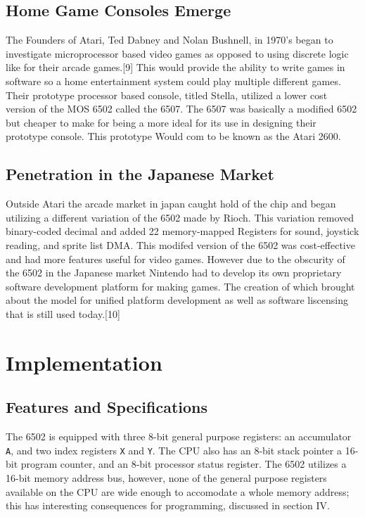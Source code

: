 \documentclass[journal]{IEEEtran}
\begin{document}
\subsection{Home Game Consoles Emerge}
The Founders of Atari, Ted Dabney and Nolan Bushnell, in 1970's began to investigate microprocessor based 
video games as opposed to using discrete logic like for their arcade games.[9]  This would provide the ability 
to write games in software so a home entertainment system could play multiple different games.  Their 
prototype processor based console, titled Stella, utilized a lower cost version of the MOS 6502 called the 
6507.  The 6507 was basically a modified 6502 but cheaper to make for being a more ideal for its use in designing 
their prototype console.  This prototype Would com to be known as the Atari 2600.  


\subsection{Penetration in the Japanese Market}
Outside Atari the arcade market in japan caught hold of the chip and began utilizing a different variation of 
the 6502 made by Rioch.  This variation removed binary-coded decimal and added 22 memory-mapped Registers for
sound, joystick reading, and sprite list DMA.  This modifed version of the 6502 was cost-effective and had more
features useful for video games.  However due to the obscurity of the 6502 in the Japanese market Nintendo had
to develop its own proprietary software development platform for making games.  The creation of which brought 
about the model for unified platform development as well as software liscensing that is still used today.[10]



\section{Implementation}

\subsection{Features and Specifications}

The 6502 is equipped with three 8-bit general purpose registers: an accumulator
\texttt{A}, and two index registers \texttt{X} and \texttt{Y}. The CPU also has
an 8-bit stack pointer a 16-bit program counter, and an 8-bit processor status
register. The 6502 utilizes a 16-bit memory address bus, however, none of the
general purpose registers available on the CPU are wide enough to accomodate a
whole memory address; this has interesting consequences for programming,
discussed in section IV.
\end{document}
